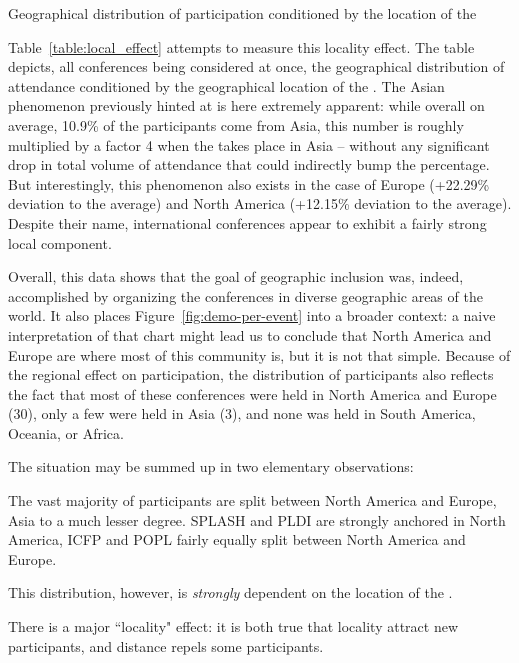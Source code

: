 \begin{table}
\caption{Geographical distribution of participation conditioned by the location of the \event}
\label{table:local_effect}
\end{table}

Table~\ref{table:local_effect} attempts to measure this locality effect. The
table depicts, all conferences being considered at once, the geographical
distribution of attendance conditioned by the geographical location of the
\event. The Asian phenomenon previously hinted at is here extremely
apparent: while overall on average, 10.9\% of the participants come from Asia,
this number is roughly multiplied by a factor 4 when the \event takes place in Asia --
without any significant drop in total volume of attendance that could indirectly bump
the percentage.
But interestingly, this phenomenon also exists in the case of Europe (+22.29\%
deviation to the average) and North America (+12.15\% deviation to the average).
Despite their name, international conferences appear to exhibit a fairly strong
local component.

Overall, this data shows that the goal of geographic inclusion was,
indeed, accomplished by organizing the conferences in diverse geographic areas
of the world. It also places Figure~\ref{fig:demo-per-event} into a broader context:
a naive interpretation of that chart might lead us to conclude that North
America and Europe are where most of this community is, but it is not that
simple. Because of the regional effect on participation, the distribution of
participants also reflects the fact that most of these conferences were held in
North America and Europe (30), only a few were held in Asia (3), and none was
held in South America, Oceania, or Africa.

The situation may be summed up in two elementary observations:
\begin{obs}
  The vast majority of participants are split between North America and Europe,
  Asia to a much lesser degree. SPLASH and PLDI are strongly anchored in North
  America, ICFP and POPL fairly equally split between North America and Europe.
  \label{obs:dist-naive}
\end{obs}
This distribution, however, is \emph{strongly} dependent on the
location of the \event.
\begin{obs}
  There is a major ``locality" effect: it is both true that locality attract
  new participants, and distance repels some participants.
  \label{obs:locality}
\end{obs}

